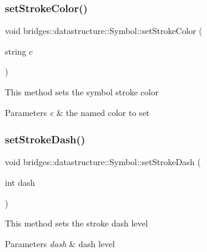 \subsubsection{\texorpdfstring{setStrokeColor()}{setStrokeColor()}\hspace{0.1cm}{\footnotesize\ttfamily [2/2]}}
{\footnotesize\ttfamily void bridges\+::datastructure\+::\+Symbol\+::set\+Stroke\+Color (\begin{DoxyParamCaption}\item[{string}]{c }\end{DoxyParamCaption})\hspace{0.3cm}{\ttfamily [inline]}}

This method sets the symbol stroke color


\begin{DoxyParams}{Parameters}
{\em c} & the named color to set \\
\hline
\end{DoxyParams}
\mbox{\label{classbridges_1_1datastructure_1_1_symbol_afd39d3b65d22bc2a1be64c8728f5e5d7}} 
\subsubsection{\texorpdfstring{setStrokeDash()}{setStrokeDash()}}
{\footnotesize\ttfamily void bridges\+::datastructure\+::\+Symbol\+::set\+Stroke\+Dash (\begin{DoxyParamCaption}\item[{int}]{dash }\end{DoxyParamCaption})\hspace{0.3cm}{\ttfamily [inline]}}

This method sets the stroke dash level


\begin{DoxyParams}{Parameters}
{\em dash} & dash level \\
\hline
\end{DoxyParams}
\mbox{\label{classbridges_1_1datastructure_1_1_symbol_a56238a4535a26bc3eea698eea4b65921}} 
